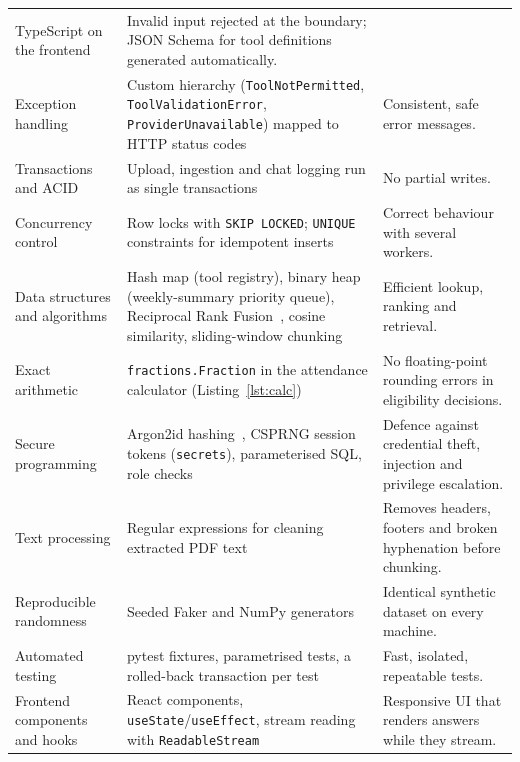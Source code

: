 \documentclass[11pt,a4paper,oneside]{report}
\begin{document}
\begin{longtable}{@{}>{\raggedright\arraybackslash}p{3.6cm}>{\raggedright\arraybackslash}p{5.9cm}>{\raggedright\arraybackslash}p{4.9cm}@{}}
TypeScript on the frontend & Invalid input rejected at the boundary; JSON Schema for tool
definitions generated automatically.\\
Exception handling & Custom hierarchy (\texttt{ToolNotPermitted},
\texttt{ToolValidationError}, \texttt{ProviderUnavailable}) mapped to HTTP status codes &
Consistent, safe error messages.\\
Transactions and ACID & Upload, ingestion and chat logging run as single transactions &
No partial writes.\\
Concurrency control & Row locks with \texttt{SKIP LOCKED}; \texttt{UNIQUE} constraints for
idempotent inserts & Correct behaviour with several workers.\\
Data structures and algorithms & Hash map (tool registry), binary heap (weekly-summary
priority queue), Reciprocal Rank Fusion~\cite{cormack2009rrf}, cosine similarity, sliding-window
chunking & Efficient lookup, ranking and retrieval.\\
Exact arithmetic & \texttt{fractions.Fraction} in the attendance calculator
(Listing~\ref{lst:calc}) & No floating-point rounding errors in eligibility decisions.\\
Secure programming & Argon2id hashing~\cite{biryukov2016argon2}, CSPRNG session tokens
(\texttt{secrets}), parameterised SQL, role checks~\cite{sandhu1996rbac} & Defence against
credential theft, injection and privilege escalation.\\
Text processing & Regular expressions for cleaning extracted PDF text & Removes headers,
footers and broken hyphenation before chunking.\\
Reproducible randomness & Seeded Faker and NumPy generators & Identical synthetic dataset on
every machine.\\
Automated testing & pytest fixtures, parametrised tests, a rolled-back transaction per test
& Fast, isolated, repeatable tests.\\
Frontend components and hooks & React components, \texttt{useState}/\texttt{useEffect},
stream reading with \texttt{ReadableStream} & Responsive UI that renders answers while they
stream.\\
\end{longtable}
\end{document}
